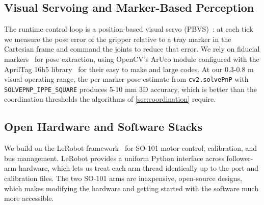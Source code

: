 \subsection{Visual Servoing and Marker-Based Perception}
The runtime control loop is a position-based visual servo (PBVS)~\cite{chaumette2006visual1}: at each tick we measure the pose error of the gripper relative to a tray marker in the Cartesian frame and command the joints to reduce that error. We rely on fiducial markers~\cite{garrido2014aruco} for pose extraction, using OpenCV's ArUco module configured with the AprilTag 16h5 library~\cite{olson2011apriltag} for their easy to make and large codes. At our 0.3-0.8 m visual operating range, the per-marker pose estimate from \texttt{cv2.solvePnP} with \texttt{SOLVEPNP\_IPPE\_SQUARE} produces 5-10 mm 3D accuracy, which is better than the coordination thresholds the algorithms of \cref{sec:coordination} require.

\subsection{Open Hardware and Software Stacks}
We build on the LeRobot framework~\cite{cadene2026lerobot} for SO-101 motor control, calibration, and bus management. LeRobot provides a uniform Python interface across follower-arm hardware, which lets us treat each arm thread identically up to the port and calibration files. The two SO-101 arms are inexpensive, open-source designs, which makes modifying the hardware and getting started with the software much more accessible.